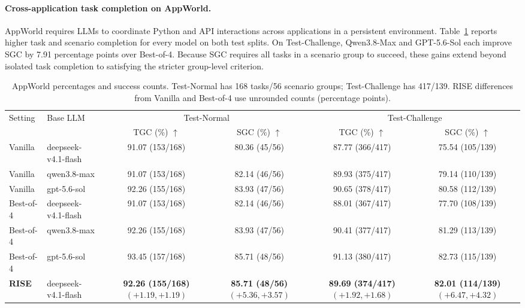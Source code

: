 \documentclass{article}
\begin{document}
\paragraph{Cross-application task completion on AppWorld.} AppWorld requires LLMs to coordinate Python and API interactions across applications in a persistent environment. Table~\ref{tab:appworld-models} reports higher task and scenario completion for every model on both test splits. On Test-Challenge, Qwen3.8-Max and GPT-5.6-Sol each improve SGC by 7.91 percentage points over Best-of-4. Because SGC requires all tasks in a scenario group to succeed, these gains extend beyond isolated task completion to satisfying the stricter group-level criterion.

\begin{table}[!htb]
\centering
\scriptsize
\setlength{\tabcolsep}{2pt}
\renewcommand{\arraystretch}{1.12}
\caption{AppWorld percentages and success counts. Test-Normal has 168 tasks/56 scenario groups; Test-Challenge has 417/139. RISE differences from Vanilla and Best-of-4 use unrounded counts (percentage points).}
\label{tab:appworld-models}
\begin{tabular*}{\linewidth}{@{\extracolsep{\fill}}llcccc@{}}
\toprule
\multirow{2}{*}{Setting} & \multirow{2}{*}{Base LLM} & \multicolumn{2}{c}{Test-Normal} & \multicolumn{2}{c}{Test-Challenge} \\
\cmidrule(lr){3-4}\cmidrule(l){5-6}
 &  & TGC (\%) $\uparrow$ & SGC (\%) $\uparrow$ & TGC (\%) $\uparrow$ & SGC (\%) $\uparrow$ \\
\midrule
Vanilla & deepseek-v4.1-flash & 91.07 (153/168) & 80.36 (45/56) & 87.77 (366/417) & 75.54 (105/139) \\
Vanilla & qwen3.8-max & 91.07 (153/168) & 82.14 (46/56) & 89.93 (375/417) & 79.14 (110/139) \\
Vanilla & gpt-5.6-sol & 92.26 (155/168) & 83.93 (47/56) & 90.65 (378/417) & 80.58 (112/139) \\
\midrule
Best-of-4 & deepseek-v4.1-flash & 91.07 (153/168) & 82.14 (46/56) & 88.01 (367/417) & 77.70 (108/139) \\
Best-of-4 & qwen3.8-max & 92.26 (155/168) & 83.93 (47/56) & 90.41 (377/417) & 81.29 (113/139) \\
Best-of-4 & gpt-5.6-sol & 93.45 (157/168) & 85.71 (48/56) & 91.13 (380/417) & 82.73 (115/139) \\
\midrule
\textbf{RISE} & deepseek-v4.1-flash & \shortstack[c]{\textbf{92.26 (155/168)}\\[-1pt]{\scriptsize $(+1.19,+1.19)$}} & \shortstack[c]{\textbf{85.71 (48/56)}\\[-1pt]{\scriptsize $(+5.36,+3.57)$}} & \shortstack[c]{\textbf{89.69 (374/417)}\\[-1pt]{\scriptsize $(+1.92,+1.68)$}} & \shortstack[c]{\textbf{82.01 (114/139)}\\[-1pt]{\scriptsize $(+6.47,+4.32)$}} \\

\end{tabular*}
\end{table}
\end{document}
